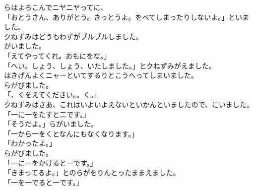 \documentclass[
    a4paper,
    10pt,
    book]
    {tarticle}
\begin{document}
\indent {}らはよろこんでニヤニヤってに、\\
「おとうさん、ありがとう。きっとうよ。をべてしまったりしないよ。」といました。\\
\indent クねずみはどうもわずがブルブルしました。\\
\indent {}がいました。\\
「えてやってくれ。おもにをな。」\\
「へい。しょう、しょう、いたしました。」とクねずみがえました。\\
\indent {}はきげんよくニャーといてするりとこうへってしまいました。\\
\indent {}らがびました。\\
「、くをえてください。。く。」\\
\indent クねずみはさあ、これはいよいよえないといかんといましたので、にいました。\\
「一に一をたすと二です。」\\
「そうだよ。」らがいました。\\
「一から一をくとなんにもなくなります。」\\
「わかったよ。」\\
\indent {}らがびました。\\
「一に一をかけると一です。」\\
「きまってるよ。」とのらがをりんとったままえました。\\
「一を一でると一です。」

\newpage
\thispagestyle{fancy}
\end{document}
